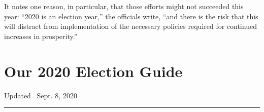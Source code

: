 It notes one reason, in particular, that those efforts might not
succeeded this year: ``2020 is an election year,'' the officials write,
``and there is the risk that this will distract from implementation of
the necessary policies required for continued increases in prosperity.''

\hypertarget{our-2020-election-guide}{%
\section{Our 2020 Election Guide}\label{our-2020-election-guide}}

Updated ~Sept. 8, 2020

\begin{center}\rule{0.5\linewidth}{\linethickness}\end{center}

